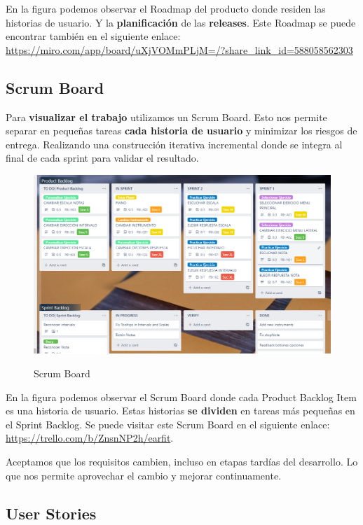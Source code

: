 \documentclass[12pt,twoside,titlepage]{report}
\begin{document}
En la figura podemos observar el Roadmap del producto donde residen las historias de usuario. Y la \textbf{planificación} de las \textbf{releases}. Este Roadmap se puede encontrar también en el siguiente enlace: \url{https://miro.com/app/board/uXjVOMmPLjM=/?share_link_id=588058562303}

\subsection{Scrum Board}

Para \textbf{visualizar el trabajo} utilizamos un Scrum Board. Esto nos permite separar en pequeñas tareas \textbf{cada historia de usuario} y minimizar los riesgos de entrega. Realizando una construcción iterativa incremental donde se integra al final de cada sprint para validar el resultado. 

\begin{figure}[H]
    \centering
    \includegraphics[scale=0.47]{Scrum/ScrumBoard}
    \label{fig:ScrumBoard}
    \caption{Scrum Board}
\end{figure}

En la figura podemos observar el Scrum Board donde cada Product Backlog Item es una historia de usuario. Estas historias \textbf{se dividen} en tareas más pequeñas en el Sprint Backlog. Se puede visitar este Scrum Board en el siguiente enlace: \url{https://trello.com/b/ZnsnNP2h/earfit}.

Aceptamos que los requisitos cambien, incluso en etapas tardías del desarrollo. Lo que nos permite aprovechar el cambio y mejorar continuamente.

\subsection{User Stories}
\end{document}
